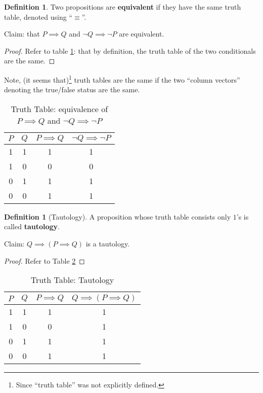 \documentclass[12pt]{article}
\theoremstyle{definition}
\newtheorem{definition}[theorem]{Definition}
\theoremstyle{plain}
\begin{document}
\begin{definition}
    Two propositions are \textbf{equivalent} if they have the same truth table, 
    denoted using ``$\equiv$''.
\end{definition}

\begin{example}
    Claim: that $P \implies Q$ and $\neg Q \implies \neg P$ are equivalent.

    \begin{proof}
        Refer to table \ref{table:equivalence_of_two_statements}: that by 
        definition, the truth table of the two conditionals are the same.
    \end{proof}

    Note, (it seems that)\footnote{Since ``truth table'' was not explicitly 
    defined.} truth tables are the same if the two ``column vectors'' denoting 
    the true/false status are the same.
\end{example}

\begin{table}[htpl]
    \caption{Truth Table: equivalence of $P \implies Q$ and $\neg Q \implies \neg P$}
    \bigskip
    \centering
    \begin{tabular}{c|c|c|c}
        $P$ & $Q$ & $P \implies Q$ & $\neg Q \implies \neg P$ \\
        \hline 
        1      & 1   & 1              & 1          \\
        1      & 0   & 0              & 0          \\
        0      & 1   & 1              & 1          \\
        0      & 0   & 1              & 1
    \end{tabular}
    \label{table:equivalence_of_two_statements}
\end{table}

\begin{definition}[Tautology]
    A proposition whose truth table consists only $1$'s is called 
    \textbf{tautology}.
\end{definition}

\begin{example}
    Claim: $Q \implies (P \implies Q)$ is a tautology.
    \begin{proof}
        Refer to Table  \ref{table:tautology_example}
    \end{proof}
\end{example}
\begin{table}[!htb]
    \caption{Truth Table: Tautology}
    \bigskip
    \centering
    \begin{tabular}{c|c|c|c}
        $P$    & $Q$ & $P\implies Q$ & $Q \implies (P \implies Q)$ \\
        \hline
        1      & 1   & 1             & 1 \\
        1      & 0   & 0             & 1  \\
        0      & 1   & 1             & 1 \\
        0      & 0   & 1             & 1
    \end{tabular}
    \label{table:tautology_example}
\end{table}
\end{document}
